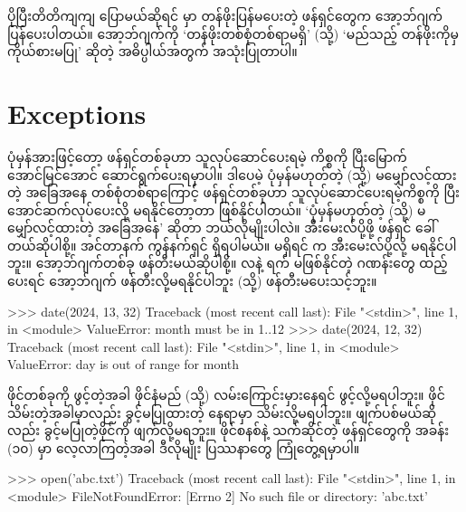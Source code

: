 \begin{mytcbox}
ပိုပြီးတိတိကျကျ ပြောမယ်ဆိုရင်  မှာ တန်ဖိုးပြန်မပေးတဲ့ ဖန်ရှင်တွေက  အော့ဘ်ဂျက် ပြန်ပေးပါတယ်။  အော့ဘ်ဂျက်ကို ‘တန်ဖိုးတစ်စုံတစ်ရာမရှိ’ (သို့) ‘မည်သည့် တန်ဖိုးကိုမှ ကိုယ်စားမပြု’ ဆိုတဲ့ အဓိပ္ပါယ်အတွက် အသုံးပြုတာပါ။
\end{mytcbox}

%
%

\section{Exceptions}
ပုံမှန်အားဖြင့်တော့ ဖန်ရှင်တစ်ခုဟာ သူလုပ်ဆောင်ပေးရမဲ့ ကိစ္စကို ပြီးမြောက် အောင်မြင်အောင် ဆောင်\allowbreak ရွက်ပေးရမှာပါ။ ဒါပေမဲ့ ပုံမှန်မဟုတ်တဲ့ (သို့) မမျှော်လင့်ထားတဲ့ အခြေအနေ တစ်စုံတစ်ရာကြောင့် ဖန်ရှင်တစ်ခုဟာ သူလုပ်ဆောင်ပေးရမဲ့ကိစ္စကို ပြီးအောင်ဆက်လုပ်ပေးလို့ မရနိုင်တော့တာ ဖြစ်နိုင်ပါတယ်။ ‘ပုံမှန်မဟုတ်တဲ့ (သို့) မမျှော်လင့်ထားတဲ့ အခြေအနေ’ ဆိုတာ ဘယ်လိုမျိုးပါလဲ။ အီးမေးလ်ပို့ဖို့  ဖန်ရှင် ခေါ်တယ်ဆိုပါစို့။ အင်တာနက် ကွန်နက်ရှင် ရှိရပါမယ်။ မရှိရင်  က အီးမေးလ်ပို့လို့ မရနိုင်ပါဘူး။  အော့ဘ်ဂျက်တစ်ခု ဖန်တီးမယ်ဆိုပါစို့။ လနဲ့ ရက် မဖြစ်နိုင်တဲ့ ဂဏန်းတွေ ထည့်ပေးရင် အော့ဘ်ဂျက် ဖန်တီးလို့မရနိုင်ပါဘူး (သို့) ဖန်တီးမပေးသင့်ဘူး။
\begin{codetxt}
>>> date(2024, 13, 32)
Traceback (most recent call last):
  File "<stdin>", line 1, in <module>
ValueError: month must be in 1..12
>>> date(2024, 12, 32)
Traceback (most recent call last):
  File "<stdin>", line 1, in <module>
ValueError: day is out of range for month
\end{codetxt}
ဖိုင်တစ်ခုကို ဖွင့်တဲ့အခါ ဖိုင်နံမည် (သို့)  လမ်းကြောင်းမှားနေရင် ဖွင့်လို့မရပါဘူး။ ဖိုင်သိမ်းတဲ့အခါမှာလည်း ခွင့်မပြုထားတဲ့ နေရာမှာ သိမ်းလို့မရပါဘူး။ ဖျက်ပစ်မယ်ဆိုလည်း ခွင့်မပြုတဲ့ဖိုင်ကို ဖျက်လို့မရဘူး။ ဖိုင်စနစ်နဲ့ သက်ဆိုင်တဲ့ ဖန်ရှင်တွေကို အခန်း (၁၀) မှာ လေ့လာကြတဲ့အခါ ဒီလိုမျိုး ပြဿနာတွေ ကြုံတွေ့ရမှာပါ။  
\begin{codetxt}
>>> open('abc.txt')
Traceback (most recent call last):
  File "<stdin>", line 1, in <module>
FileNotFoundError: [Errno 2] No such file or directory: 'abc.txt'
\end{codetxt}

